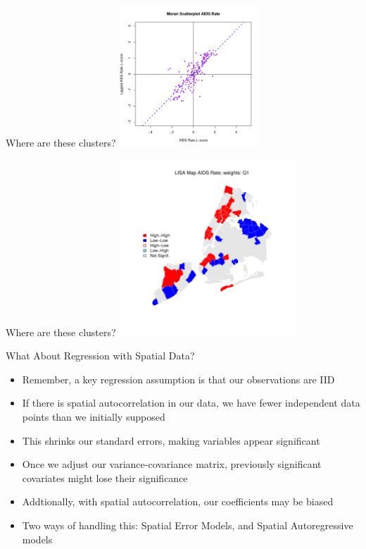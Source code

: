\documentclass[aspectratio = 169, 12pt]{beamer}\usepackage[]{graphicx}\usepackage[]{color}
\newenvironment{knitrout}{}{} %
\begin{document}
\begin{frame}[fragile]{Where are these clusters?}
\begin{knitrout}
\color{fgcolor}
\includegraphics[width=200px]{figure/unnamed-chunk-6-1} 

\end{knitrout}
\end{frame}

\begin{frame}[fragile]{Where are these clusters?}
\begin{knitrout}\tiny
{}\color{fgcolor}
\includegraphics[width=250px]{figure/unnamed-chunk-7-1} 

\end{knitrout}
\end{frame}

\begin{frame}{What About Regression with Spatial Data?}
\begin{itemize}
\item Remember, a key regression assumption is that our observations are IID
\item If there is spatial autocorrelation in our data, we have fewer independent data points than we initially supposed
\item This shrinks our standard errors, making variables appear significant
\item Once we adjust our variance-covariance matrix, previously significant covariates might lose their significance 
\item Addtionally, with spatial autocorrelation, our coefficients may be biased 
\item Two ways of handling this: Spatial Error Models, and Spatial Autoregressive models
\end{itemize}
\end{frame}
\end{document}
